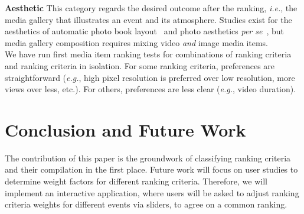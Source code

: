 \documentclass[runningheads,a4paper,11pt]{llncs}
\begin{document}
\noindent \textbf{Aesthetic}
This category regards the desired outcome after the ranking, \emph{i.e.},
the media gallery that illustrates an event and its atmosphere.
Studies exist for the aesthetics of
automatic photo book layout~\cite{Photo2011}
and photo aesthetics \emph{per se}~\cite{Photo2012},
but media gallery composition requires mixing video \emph{and} image media items.\\

\noindent We have run first media item ranking tests for combinations
of ranking criteria and ranking criteria in isolation.
For some ranking criteria, preferences are straightforward
(\emph{e.g.}, high pixel resolution is preferred over low resolution,
more views over less, etc.).
For others, preferences are less clear (\emph{e.g.}, video duration).

\section{Conclusion and Future Work}
The contribution of this paper is the groundwork of classifying ranking criteria
and their compilation in the first place.
Future work will focus on user studies to determine weight factors
for different ranking criteria.
Therefore, we will implement an interactive application,
where users will be asked to adjust ranking criteria weights
for different events via sliders, to agree on a common ranking.

\renewcommand{\ttdefault}{cmvtt}
\renewcommand\UrlFont\tt



\end{document}
